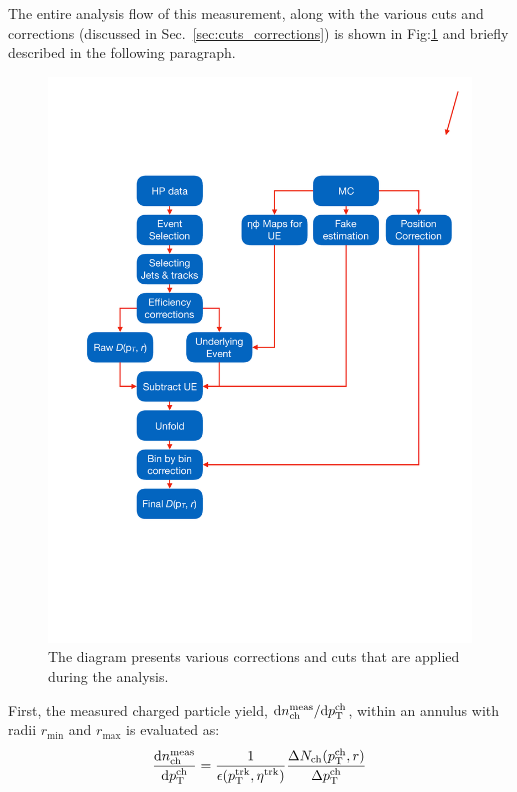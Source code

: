 The entire analysis flow of this measurement, along with the various cuts and corrections (discussed in Sec.~\ref{sec:cuts_corrections}) is shown in Fig:\ref{Fig:analysis_flow} and briefly described in the following paragraph.

\begin{figure}
\centerline{
\includegraphics[width=20.cm]{figures_general/Shape_analyses_flow.pdf}
}
\caption{The diagram presents various corrections and cuts that are applied during the analysis.}
\label{Fig:analysis_flow}
\end{figure}

First, the measured charged particle yield, $\text{d}n^{\text{meas}}_{\text{ch}}/\text{d}\mbox{$p_{{\mathrm{T}}}^{\mathrm{ch}}$}$, within an annulus with radii $r_{\text{min}}$ and $r_{\text{max}}$ is evaluated as:
\begin{equation}
\frac{\text{d}n^{\text{meas}}_{\text{ch}}}{\text{d}\pTch} = \frac{1}{\epsilon(\pttrk, \etatrk)} \frac{\Delta N_{\text{ch}} (\pTch, r)}{\Delta \pTch}
\end{equation}


